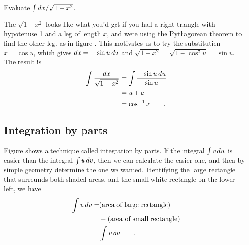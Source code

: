 \begin{eg}
\egquestion Evaluate $\int \mathop{d\!} x/\sqrt{1-x^2}$.

\eganswer The $\sqrt{1-x^2}$ looks like what you'd get if you had a right
triangle with hypotenuse 1 and a leg of length $x$, and were using the
Pythagorean theorem to find the other leg, as in figure .
This motivates us to try the substitution $x=\cos u$, which gives
$\mathop{d\!} x=-\sin u\mathop{d\!} u$ and $\sqrt{1-x^2}=\sqrt{1-\cos^2u}=\sin u$. The result is
\begin{align*}
  \int \frac{\mathop{d\!} x}{\sqrt{1-x^2}} &= \int \frac{-\sin u\mathop{d\!} u}{\sin u} \\
                 &= u+c \\
                 &= \cos^{-1}x \qquad .
\end{align*}
\end{eg}
%

\subsection{Integration by parts}

Figure  shows a technique called integration by parts.
If the integral $\int v\mathop{d\!} u$ is easier than the integral $\int u\mathop{d\!} v$,
then we can calculate the easier one, and then by simple geometry determine
the one we wanted. Identifying the large rectangle that surrounds both
shaded areas, and the small white rectangle on the lower left, we have
\begin{align*}
  \int u\mathop{d\!} v =& (\text{area of large rectangle})\\
                &-(\text{area of small rectangle})\\
                &\int v\mathop{d\!} u \qquad .
\end{align*}


